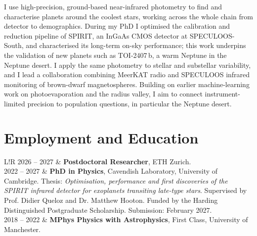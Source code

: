 \documentclass{article}
\begin{document}
\noindent I use high-precision, ground-based near-infrared photometry to find and characterise planets around the coolest stars, working across the whole chain from detector to demographics. During my PhD I optimised the calibration and reduction pipeline of SPIRIT, an InGaAs CMOS detector at SPECULOOS-South, and characterised its long-term on-sky performance; this work underpins the validation of new planets such as TOI-2407\,b, a warm Neptune in the Neptune desert. I apply the same photometry to stellar and substellar variability, and I lead a collaboration combining MeerKAT radio and SPECULOOS infrared monitoring of brown-dwarf magnetospheres. Building on earlier machine-learning work on photoevaporation and the radius valley, I aim to connect instrument-limited precision to population questions, in particular the Neptune desert.

\section*{Employment and Education}
\begin{tabular}{L!{\vrule}R}
  2026 -- 2027 & \textbf{Postdoctoral Researcher}, ETH Zurich. \\
	2022 -- 2027 & \textbf{PhD in Physics}, Cavendish Laboratory, University of Cambridge. Thesis: \textit{Optimisation, performance and first discoveries of the SPIRIT infrared detector for exoplanets transiting late-type stars}. Supervised by Prof. Didier Queloz and Dr. Matthew Hooton. Funded by the Harding Distinguished Postgraduate Scholarship. Submission: February 2027. \\
	2018 -- 2022 & \textbf{MPhys Physics with Astrophysics}, First Class, University of Manchester.  \\
\end{tabular}
\end{document}
